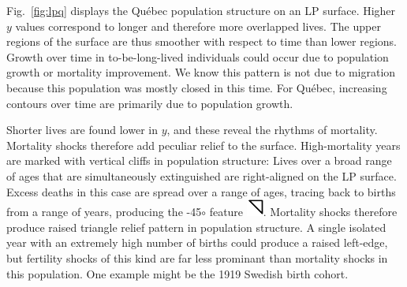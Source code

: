 Fig.~\ref{fig:lpq} displays the Qu\'{e}bec population structure on an LP surface. Higher $y$ values correspond to longer and therefore more overlapped lives. The upper regions of the surface are thus smoother with respect to time than lower regions. Growth over time in to-be-long-lived individuals could occur due to population growth or mortality improvement. We know this pattern is not due to migration because this population was mostly closed in this time. For Qu\'{e}bec, increasing contours over time are primarily due to population growth. 

Shorter lives are found lower in $y$, and these reveal the rhythms of mortality. Mortality shocks therefore add peculiar relief to the surface. High-mortality years are marked with vertical cliffs in population structure: Lives over a broad range of ages that are simultaneously extinguished are right-aligned on the LP surface. Excess deaths in this case are spread over a range of ages, tracing back to births from a range of years, producing the -45$\circ$ feature \includegraphics{Figures/LP_mort_tri.pdf}. Mortality shocks therefore produce raised triangle relief pattern in population structure. A single isolated year with an extremely high number of births could produce a raised left-edge, but fertility shocks of this kind are far less prominant than mortality shocks in this population. One example might be the 1919 Swedish birth cohort.


